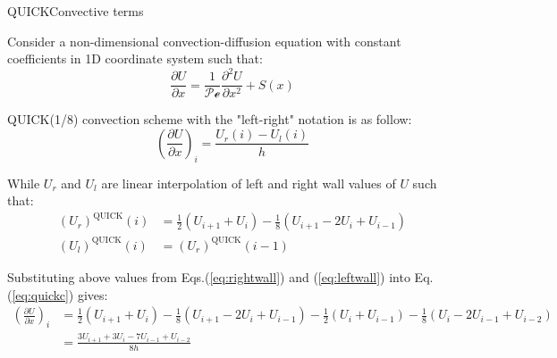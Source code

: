 \documentclass[aspectratio=169, sectionpages, codemintedoverleaf, bibref]{beamer}
\begin{document}
\begin{frame}{QUICK}{Convective terms}

    \prob Consider a non-dimensional convection-diffusion equation with constant coefficients in 1D coordinate system such that: \begin{equation}
	    \frac{\partial U}{\partial x} = \frac{1}{\mathcal{Pe}} \frac{\partial^2 U}{\partial x^2} + S(x)
 	\end{equation}

    \framebreak
    
    \soln QUICK(1/8) convection scheme with the "left-right" notation is as follow: \begin{equation}
	    \left( \frac{\partial U}{\partial x} \right)_i = \frac{U_r (i) - U_l (i)}{h}
        \label{eq:quickc}
	\end{equation}

    While $U_r$ and $U_l$ are linear interpolation of left and right wall values of $U$ such that: \begin{align}
        \left( U_r \right)^{\text{QUICK}} (i) &= \frac{1}{2} \left( U_{i+1} + U_i \right) - \frac{1}{8} \left( U_{i+1} - 2 U_i + U_{i-1} \right) \label{eq:rightwall} \\
        \left( U_l \right)^{\text{QUICK}} (i) &= \left( U_r \right)^{\text{QUICK}} (i-1) \label{eq:leftwall}
    \end{align}

    Substituting above values from Eqs.(\ref{eq:rightwall}) and (\ref{eq:leftwall}) into Eq. (\ref{eq:quickc}) gives: \begin{align}
        \left( \frac{\partial U}{\partial x} \right)_i &= \frac{1}{2} \left( U_{i+1} + U_i \right) - \frac{1}{8} \left( U_{i+1} - 2 U_i + U_{i-1} \right) - \frac{1}{2} \left( U_i + U_{i-1} \right) - \frac{1}{8} \left( U_i - 2 U_{i-1} + U_{i-2} \right) \\
        &= \frac{3 U_{i+1} + 3 U_i - 7 U_{i-1} + U_{i-2}}{8h}
    \end{align}
    
\end{frame}
\end{document}

